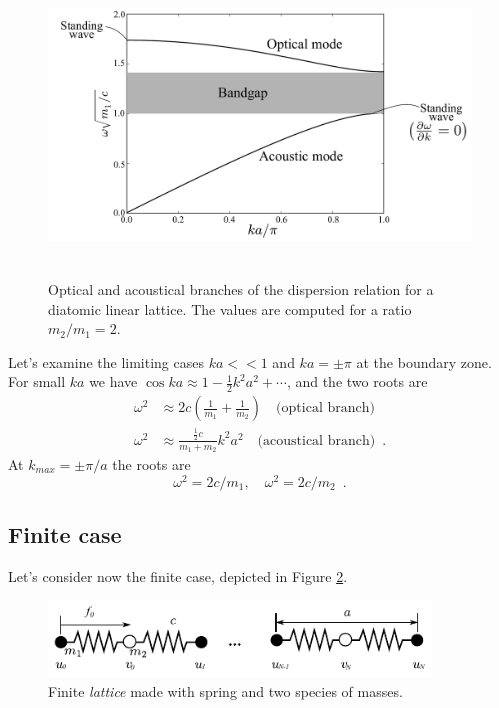 \documentclass[12pt]{article}
\begin{document}
\begin{figure}[h]
\centering
\includegraphics[height=8cm]{img/diatomic-plot.pdf} 
\caption{Optical and acoustical branches of the dispersion relation for a diatomic linear lattice. The values are computed for a ratio $m_2/m_1 = 2$.}
\label{fig:diatomic_dispersion}
\end{figure}
Let's examine the limiting cases $ka<<1$ and $ka=\pm \pi$ at the boundary zone. For small $ka$ we have $\cos ka \approx 1 - \frac{1}{2}k^2a^2 + \cdots$, and the two roots are
\begin{align}
\omega^2 &\approx 2c\left(\frac{1}{m_1} + \frac{1}{m_2}\right)\quad \mbox{(optical branch)}\\
\omega^2 &\approx \frac{\frac{1}{2}c}{m_1+m_2}k^2a^2\quad \mbox{(acoustical branch)} \enspace  .
\end{align}
At $k_{max}=\pm\pi/a$ the roots are
\[\omega^2 = 2c/m_1,\quad \omega^2 = 2c/m_2 \enspace .\]

\subsection{Finite case}
Let's consider now the finite case, depicted in Figure \ref{fig:diatomic-finite}.
\begin{figure}[H]
\centering
\includegraphics[width=4in]{img/diatomic-finite.pdf} 
\caption{Finite \emph{lattice} made with spring and two species of masses.}
\label{fig:diatomic-finite}
\end{figure}
\end{document}
